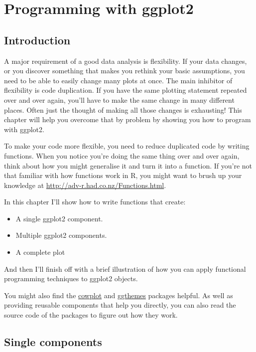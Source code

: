 \chapter{Programming with ggplot2}\label{cha:programming}

\section{Introduction}

A major requirement of a good data analysis is flexibility. If your data
changes, or you discover something that makes you rethink your basic
assumptions, you need to be able to easily change many plots at once.
The main inhibitor of flexibility is code duplication. If you have the
same plotting statement repeated over and over again, you'll have to
make the same change in many different places. Often just the thought of
making all those changes is exhausting! This chapter will help you
overcome that by problem by showing you how to program with ggplot2.

To make your code more flexible, you need to reduce duplicated code by
writing functions. When you notice you're doing the same thing over and
over again, think about how you might generalise it and turn it into a
function. If you're not that familiar with how functions work in R, you
might want to brush up your knowledge at
\url{http://adv-r.had.co.nz/Functions.html}.

In this chapter I'll show how to write functions that create:

\begin{itemize}
\tightlist
\item
  A single ggplot2 component.
\item
  Multiple ggplot2 components.
\item
  A complete plot
\end{itemize}

And then I'll finish off with a brief illustration of how you can apply
functional programming techniques to ggplot2 objects.

You might also find the
\href{https://github.com/wilkelab/cowplot}{cowplot} and
\href{https://github.com/jrnold/ggthemes}{ggthemes} packages helpful. As
well as providing reusable components that help you directly, you can
also read the source code of the packages to figure out how they work.

\section{Single components}


